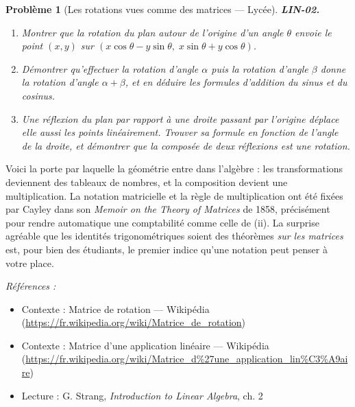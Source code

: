 \documentclass[11pt]{article}
\newtheorem{problem}{Problème}
\newenvironment{refs}{\par\small\noindent\emph{Références :}\begin{itemize}\setlength\itemsep{0pt}}{\end{itemize}\normalsize}
\begin{document}
\bigskip

\begin{problem}[{Les rotations vues comme des matrices --- Lycée}]
\textbf{LIN-02.} \begin{enumerate}
\item[(i)] Montrer que la rotation du plan autour de l'origine d'un angle
$\theta$ envoie le point $(x, y)$ sur
$(x \cos\theta - y \sin\theta, \; x \sin\theta + y \cos\theta)$.
\item[(ii)] Démontrer qu'effectuer
la rotation d'angle $\alpha$ puis la rotation d'angle $\beta$ donne la rotation d'angle
$\alpha + \beta$, et en déduire les formules d'addition du sinus et du cosinus.
\item[(iii)] Une réflexion
du plan par rapport à une droite passant par l'origine déplace elle aussi les points linéairement.
Trouver sa formule en fonction de l'angle de la droite, et démontrer que la composée de deux
réflexions est une rotation.
\end{enumerate}

\end{problem}

\noindent Voici la porte par laquelle la géométrie entre dans l'algèbre : les transformations
deviennent des tableaux de nombres, et la composition devient une multiplication. La notation
matricielle et la règle de multiplication ont été fixées par Cayley dans son \textit{Memoir on the Theory
of Matrices} de 1858, précisément pour rendre automatique une comptabilité comme celle de (ii).
La surprise agréable que les identités trigonométriques soient des théorèmes \textit{sur les matrices}
est, pour bien des étudiants, le premier indice qu'une notation peut penser à votre place.

\begin{refs}
\item Contexte : Matrice de rotation --- Wikipédia (\url{https://fr.wikipedia.org/wiki/Matrice_de_rotation})
\item Contexte : Matrice d'une application linéaire --- Wikipédia (\url{https://fr.wikipedia.org/wiki/Matrice_d%27une_application_lin%C3%A9aire})
\item Lecture : G. Strang, \textit{Introduction to Linear Algebra}, ch. 2
\end{refs}

\bigskip
\end{document}
